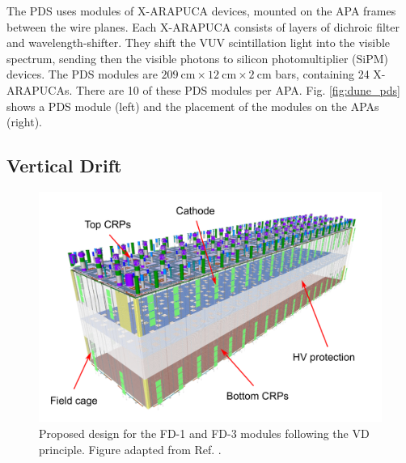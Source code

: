 The PDS uses modules of X-ARAPUCA devices, mounted on the APA frames between the wire planes. Each X-ARAPUCA consists of layers of dichroic filter and wavelength-shifter. They shift the VUV scintillation light into the visible spectrum, sending then the visible photons to silicon photomultiplier (SiPM) devices. The PDS modules are $209~\mathrm{cm}\times12~\mathrm{cm}\times2~\mathrm{cm}$ bars, containing 24 X-ARAPUCAs. There are 10 of these PDS modules per APA. Fig. \ref{fig:dune_pds} shows a PDS module (left) and the placement of the modules on the APAs (right).

\subsection{Vertical Drift}

\begin{figure}[t]
	\centering
	\includegraphics[width=0.70\linewidth]{Images/DUNE/FD/dune_vd}
	\caption[Proposed design for the FD-1 and FD-3 modules following the VD principle.]{Proposed design for the FD-1 and FD-3 modules following the VD principle. Figure adapted from Ref. \cite{DUNEVDTDR}.}
	\label{fig:dune_vd}
\end{figure}

